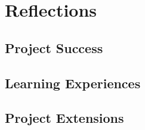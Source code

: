 \section{Reflections}

\subsection{Project Success}

\subsection{Learning Experiences}

\subsection{Project Extensions}
